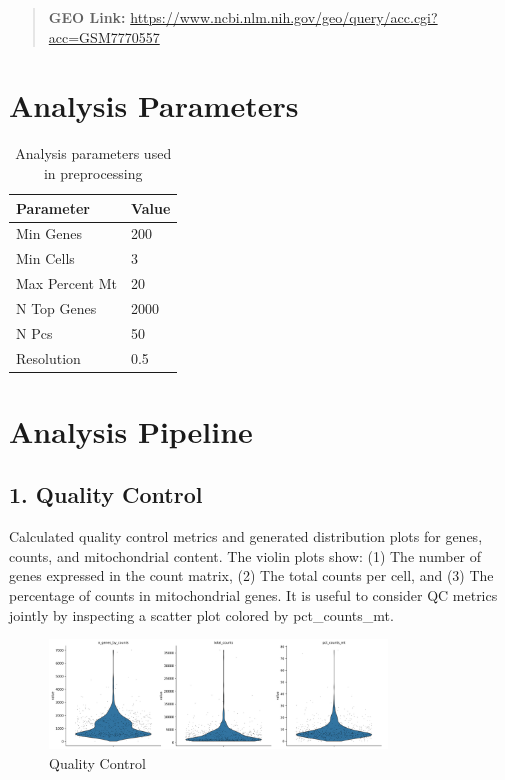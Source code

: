 \documentclass[12pt]{article}
\begin{document}
\begin{quote}
    \textbf{GEO Link:} \url{https://www.ncbi.nlm.nih.gov/geo/query/acc.cgi?acc=GSM7770557}
\end{quote}

\section{Analysis Parameters}
\begin{table}[H]
    \centering
    \begin{tabular}{ll}
        \toprule
        \textbf{Parameter} & \textbf{Value} \\
        \midrule
        Min Genes & 200 \\
        Min Cells & 3 \\
        Max Percent Mt & 20 \\
        N Top Genes & 2000 \\
        N Pcs & 50 \\
        Resolution & 0.5 \\

        \bottomrule
    \end{tabular}
    \caption{Analysis parameters used in preprocessing}
    \label{tab:parameters}
\end{table}

\section{{Analysis Pipeline}}

\subsection{1. Quality Control}
Calculated quality control metrics and generated distribution plots for genes, counts, and mitochondrial content. The violin plots show: (1) The number of genes expressed in the count matrix, (2) The total counts per cell, and (3) The percentage of counts in mitochondrial genes. It is useful to consider QC metrics jointly by inspecting a scatter plot colored by pct\_counts\_mt.

\begin{figure}[H]
    \centering
    \includegraphics[width=0.8\textwidth]{qc_distributions.png}
    \caption{Quality Control}
    \label{fig:qc_distributions}
\end{figure}
\end{document}
